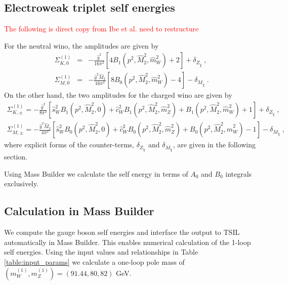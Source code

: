 \documentclass[11pt]{article}
\begin{document}
\subsection{Electroweak triplet self energies}
\textcolor{red}{The following is direct copy from Ibe et al.  need to restructure}

For the neutral wino, the amplitudes are given by
{
\begin{eqnarray}
\Sigma_{K, 0}^{(1)} &=&
-\frac{\hat{g}^2}{16\pi^2}
\left[ 4 B_1(p^2, \hat{M}_2^2, \hat{m}_W^2) + 2 \right]
+\delta_{Z_{\tilde{\chi}}}\ , \label{eq: Neu_K} \\
\Sigma_{M, 0}^{(1)} &=&
-\frac{\hat{g}^2 \hat{M}_2}{16\pi^2}
\left[ 8 B_0(p^2, \hat{M}_2^2, \hat{m}_W^2) - 4 \right]
-\delta_{M_{\tilde{\chi}}}\ . \label{eq: Neu_M}
\end{eqnarray}
}On the other hand, the two amplitudes for the charged wino are given by
{
\begin{eqnarray}
\Sigma_{K, \pm}^{(1)} =
-\frac{\hat{g}^2}{8\pi^2}
\left[ \hat{s}_W^2 B_1(p^2,\hat{M}_2^2,0)
+\hat{c}_W^2 B_1(p^2,\hat{M}_2^2, \hat m_Z^2)
+B_1(p^2, \hat{M}_2^2, \hat{m}_W^2) + 1  \right]
+ \delta_{Z_{\tilde{\chi}}}\ , \label{eq: Cha_K} \\
\Sigma_{M, \pm}^{(1)} =
-\frac{\hat{g}^2 \hat{M}_2}{4\pi^2}
\left[ \hat{s}_W^2 B_0(p^2, \hat{M}_2^2,0)
+\hat{c}_W^2 B_0(p^2, \hat{M}_2^2, \hat{m}_Z^2)
+B_0(p^2, \hat{M}_2^2, \hat{m}_W^2) - 1 \right]
-\delta_{M_{\tilde{\chi}}}\ ,
 \label{eq: Cha_M}
\end{eqnarray}
}where explicit forms of the counter-terms, $\delta_{Z_{\tilde{\chi}}}$ and $\delta_{M_{\tilde{\chi}}}$, are given in the following section.

Using Mass Builder we calculate the self energy in terms of $A_0$ and $B_0$ integrals exclusively.



\subsection{Calculation in Mass Builder}

We compute the gauge boson self energies and interface the output to TSIL automatically in Mass Builder.  This enables numerical calculation of the 1-loop self energies.  Using the input values and relationships in Table \ref{table:input_params} we calculate a one-loop pole mass of $(m_W^{(1)},m_Z^{(1)}) = (91.44,80,82)$ GeV.
\end{document}
